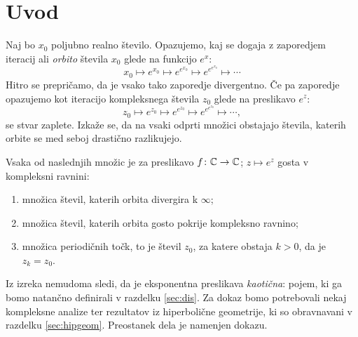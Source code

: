 \section{Uvod} \label{sec:intro}

Naj bo \(x_0\) poljubno realno število. Opazujemo, kaj se dogaja z zaporedjem iteracij ali \emph{orbito} števila \(x_0\) glede na funkcijo \(e^{x}\):
\[x_0 \mapsto e^{x_0} \mapsto e^{e^{x_0}} \mapsto e^{e^{e^{x_0}}} \mapsto \cdots\]
Hitro se prepričamo, da je vsako tako zaporedje divergentno. Če pa zaporedje opazujemo kot iteracijo kompleksnega števila \(z_0\) glede na preslikavo \(e^z\):
\[z_0 \mapsto e^{z_0} \mapsto e^{e^{z_0}} \mapsto e^{e^{e^{z_0}}} \mapsto \cdots,\]
se stvar zaplete. Izkaže se, da na vsaki odprti množici obstajajo števila, katerih orbite se med seboj drastično razlikujejo.

\begin{izrek} \label{thm:orbits}
    Vsaka od naslednjih množic je za preslikavo \(f \colon \mathbb C \to \mathbb C\); \(z \mapsto e^{z}\) gosta v kompleksni ravnini:
    \begin{enumerate}
        \item množica števil, katerih orbita divergira k \(\infty\);
        \item množica števil, katerih orbita gosto pokrije kompleksno ravnino;
        \item množica periodičnih točk, to je števil \(z_0\), za katere obstaja \(k > 0\), da je \(z_k = z_0\).
    \end{enumerate}
\end{izrek}

\noindent Iz izreka nemudoma sledi, da je eksponentna preslikava \emph{kaotična}: pojem, ki ga bomo natančno definirali v razdelku \ref{sec:dis}. Za dokaz bomo potrebovali nekaj kompleksne analize ter rezultatov iz hiperbolične geometrije, ki so obravnavani v razdelku \ref{sec:hipgeom}. Preostanek dela je namenjen dokazu.
